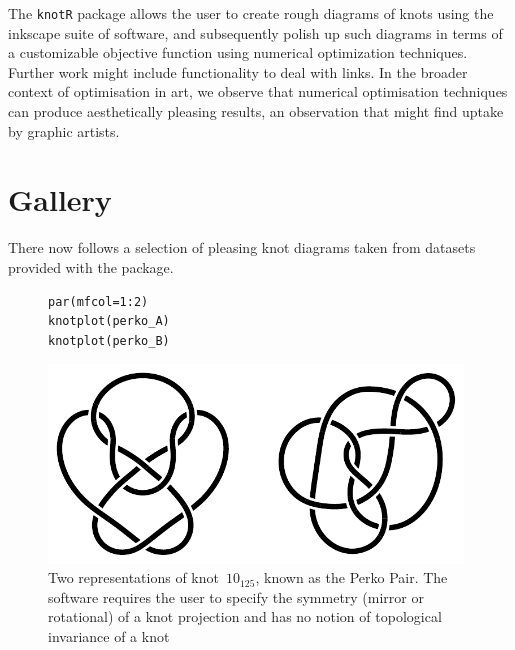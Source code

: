 \documentclass{birkjour}
\theoremstyle{definition}
\theoremstyle{remark}
\numberwithin{equation}{section}
\begin{document}
The {\tt knotR} package allows the user to create rough diagrams of
knots using the inkscape suite of software, and subsequently polish up
such diagrams in terms of a customizable objective function using
numerical optimization techniques.  Further work might include
functionality to deal with links.  In the broader context of
optimisation in art, we observe that numerical optimisation techniques
can produce aesthetically pleasing results, an observation that might
find uptake by graphic artists.

\clearpage
\section{Gallery}

There now follows a selection of pleasing knot diagrams taken from
datasets provided with the package.

\begin{figure}[htbp]
  \begin{center}
\begin{verbatim}
par(mfcol=1:2)
knotplot(perko_A)
knotplot(perko_B)
\end{verbatim}
\includegraphics[width=11cm]{knot-perko_A_and_B}
\caption{Two representations of knot~$10_{125}$, known as the 
  \label{perko_AB}  Perko Pair.  The software requires the user to
  specify the symmetry (mirror or rotational) of a knot projection and
  has no notion of topological invariance of a knot}
  \end{center}
\end{figure}
\end{document}
